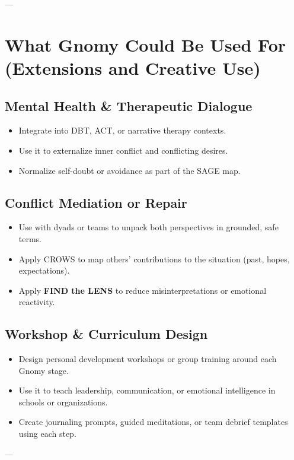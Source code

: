 \documentclass{article}
\begin{document}
---

\section{What Gnomy Could Be Used For (Extensions and Creative Use)}

\subsection{Mental Health \& Therapeutic Dialogue}
\begin{itemize}[noitemsep,topsep=0pt]
    \item Integrate into DBT, ACT, or narrative therapy contexts.
    \item Use it to externalize inner conflict and conflicting desires.
    \item Normalize self-doubt or avoidance as part of the SAGE map.
\end{itemize}

\subsection{Conflict Mediation or Repair}
\begin{itemize}[noitemsep,topsep=0pt]
    \item Use with dyads or teams to unpack both perspectives in grounded, safe terms.
    \item Apply CROWS to map others' contributions to the situation (past, hopes, expectations).
    \item Apply \textbf{FIND the LENS} to reduce misinterpretations or emotional reactivity.
\end{itemize}

\subsection{Workshop \& Curriculum Design}
\begin{itemize}[noitemsep,topsep=0pt]
    \item Design personal development workshops or group training around each Gnomy stage.
    \item Use it to teach leadership, communication, or emotional intelligence in schools or organizations.
    \item Create journaling prompts, guided meditations, or team debrief templates using each step.
\end{itemize}

---
\end{document}
